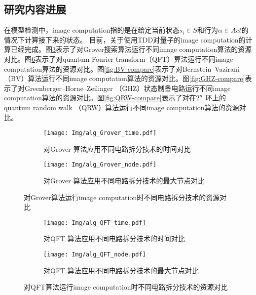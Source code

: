 \subsection{研究内容进展}
在模型检测中，image computation指的是在给定当前状态$s_i\in S$和行为$\alpha\in Act$的情况下计算接下来的状态。
目前，关于使用TDD对量子的image computation的计算已经完成。图\ref{fig:grover-compare}表示了对Grover搜索算法运行不同image computation算法的资源对比。图\ref{fig:QFT-compare}表示了对quantum Fourier transform（QFT）算法运行不同image computation算法的资源对比。图\ref{fig:BV-compare}表示了对Bernstein–Vazirani（BV）算法运行不同image computation算法的资源对比。图\ref{fig:GHZ-compare}表示了对Greenberger–Horne–Zeilinger （GHZ）状态制备电路运行不同image computation算法的资源对比。图\ref{fig:QRW-compare}表示了对在$2^n$ 环上的quantum random walk （QRW）算法运行不同image computation算法的资源对比。
\begin{figure}[!htbp]
    \centering
    \begin{subfigure}[b]{.4\textwidth}
        \centering
        \texttt{[image: Img/alg\_Grover\_time.pdf]}
        \caption{对Grover 算法应用不同电路拆分技术的时间对比}
        \label{fig:grover-time}
    \end{subfigure}
    \qquad
    \begin{subfigure}[b]{.4\textwidth}
        \centering
        \texttt{[image: Img/alg\_Grover\_node.pdf]}
        \caption{对Grover 算法应用不同电路拆分技术的最大节点对比}
        \label{fig:grover-node}
    \end{subfigure}
    
    \caption{对Grover算法运行image computation时不同电路拆分技术的资源对比}
    \label{fig:grover-compare}
\end{figure}
\begin{figure}[!htbp]
    \centering
    \begin{subfigure}[b]{.4\textwidth}
        \centering
        \texttt{[image: Img/alg\_QFT\_time.pdf]}
        \caption{对QFT 算法应用不同电路拆分技术的时间对比}
        \label{fig:QFT-time}
    \end{subfigure}
    \qquad
    \begin{subfigure}[b]{.4\textwidth}
        \centering
        \texttt{[image: Img/alg\_QFT\_node.pdf]}
        \caption{对QFT 算法应用不同电路拆分技术的最大节点对比}
        \label{fig:QFT-node}
    \end{subfigure}
    \caption{对QFT算法运行image computation时不同电路拆分技术的资源对比}
    \label{fig:QFT-compare}
\end{figure}
